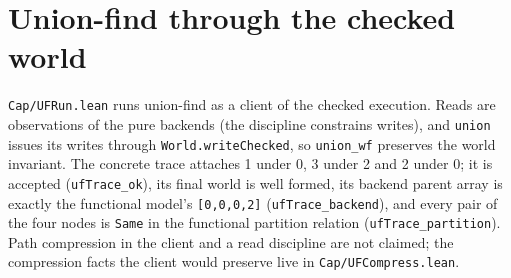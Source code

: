 \documentclass[10pt,a4paper]{article}
\newcommand{\file}[1]{\texttt{\small #1}}
\begin{document}
\section{Union-find through the checked world}

\file{Cap/UFRun.lean} runs union-find as a client of the checked execution. Reads
are observations of the pure backends (the discipline constrains writes), and
\texttt{union} issues its writes through \texttt{World.writeChecked}, so
\texttt{union\_wf} preserves the world invariant. The concrete trace attaches 1
under 0, 3 under 2 and 2 under 0; it is accepted (\texttt{ufTrace\_ok}), its
final world is well formed, its backend parent array is exactly the functional
model's \texttt{[0,0,0,2]} (\texttt{ufTrace\_backend}), and every pair of the
four nodes is \texttt{Same} in the functional partition relation
(\texttt{ufTrace\_partition}). Path compression in the client and a read
discipline are not claimed; the compression facts the client would preserve live
in \file{Cap/UFCompress.lean}.
\end{document}

